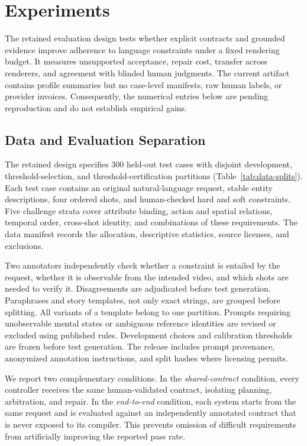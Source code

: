 \section{Experiments}
\label{sec:experiments}

The retained evaluation design tests whether explicit contracts and grounded
evidence improve adherence to language constraints under a fixed rendering
budget. It measures unsupported acceptance, repair cost, transfer across
renderers, and agreement with blinded human judgments. The current artifact
contains profile summaries but no case-level manifests, raw human labels, or
provider invoices. Consequently, the numerical entries below are pending
reproduction and do not establish empirical gains.

\subsection{Data and Evaluation Separation}
\label{sec:data}
The retained design specifies 300 held-out test cases with disjoint development,
threshold-selection, and threshold-certification partitions
(Table~\ref{tab:data-splits}). Each test case contains an original
natural-language request, stable entity descriptions, four ordered shots, and
human-checked hard and soft constraints. Five challenge strata cover attribute
binding, action and spatial relations, temporal order, cross-shot identity, and
combinations of these requirements. The data manifest records the allocation,
descriptive statistics, source licenses, and exclusions.

Two annotators independently check whether a constraint is entailed by the
request, whether it is observable from the intended video, and which shots are
needed to verify it. Disagreements are adjudicated before test generation.
Paraphrases and story templates, not only exact strings, are grouped before
splitting. All variants of a template belong to one partition. Prompts requiring
unobservable mental states or ambiguous reference identities are revised or
excluded using published rules. Development choices and calibration thresholds
are frozen before test generation. The release includes prompt provenance, anonymized annotation instructions,
and split hashes where licensing permits.

We report two complementary conditions. In the \emph{shared-contract} condition,
every controller receives the same human-validated contract, isolating planning,
arbitration, and repair. In the \emph{end-to-end} condition, each system starts from
the same request and is evaluated against an independently annotated contract
that is never exposed to its compiler. This prevents omission of difficult
requirements from artificially improving the reported pass rate.

